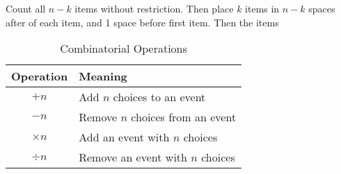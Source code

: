 \documentclass{article}
\begin{document}
    Count all $n - k$ items without restriction. Then place $k$ items in $n - k$ spaces after of each item, and 1 space before first item. Then the items

    \begin{table}[h]
        \caption{Combinatorial Operations}
        \centering
        \begin{tabular}{cl}
            \toprule
            Operation & Meaning \\
            \midrule
            $+ n$ & Add $n$ choices to an event \\
            $- n$ & Remove $n$ choices from an event \\
            $\times n$ & Add an event with $n$ choices \\
            $\div n$ & Remove an event with $n$ choices \\
            \bottomrule
        \end{tabular}
    \end{table}
\end{document}
